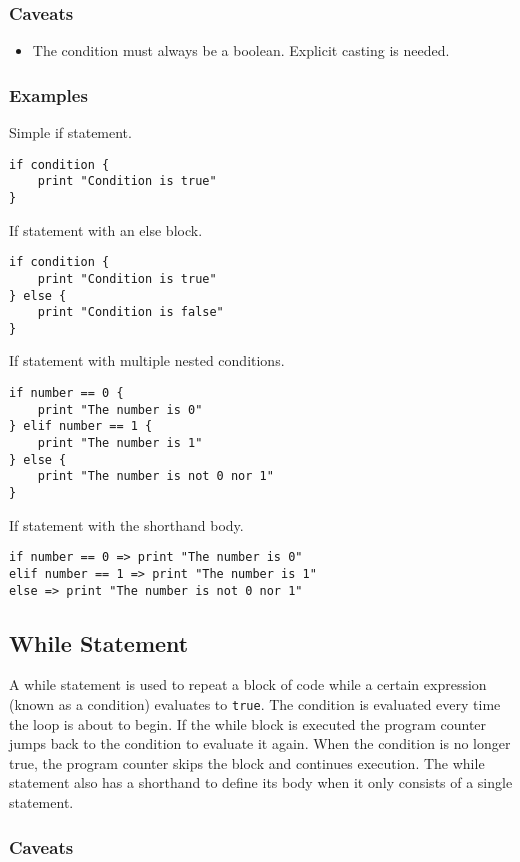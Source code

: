 \subsubsection{Caveats}

\begin{itemize}
    \item The condition must always be a boolean. Explicit casting is needed.
\end{itemize}
\clearpage
\subsubsection{Examples}

Simple if statement.
\begin{verbatim}
if condition {
    print "Condition is true"
}
\end{verbatim}
If statement with an else block.
\begin{verbatim}
if condition {
    print "Condition is true"
} else {
    print "Condition is false"
}
\end{verbatim}
If statement with multiple nested conditions.
\begin{verbatim}
if number == 0 {
    print "The number is 0"
} elif number == 1 {
    print "The number is 1"
} else {
    print "The number is not 0 nor 1"
}
\end{verbatim}
If statement with the shorthand body.
\begin{verbatim}
if number == 0 => print "The number is 0"
elif number == 1 => print "The number is 1"
else => print "The number is not 0 nor 1"
\end{verbatim}

\subsection{While Statement}

A while statement is used to repeat a block of code while a certain expression (known as a condition) evaluates to \texttt{true}.
The condition is evaluated every time the loop is about to begin. If the while block is executed the program counter jumps back
to the condition to evaluate it again. When the condition is no longer true, the program counter skips the block and continues execution.
The while statement also has a shorthand to define its body when it only consists of a single statement.

\subsubsection{Caveats}

